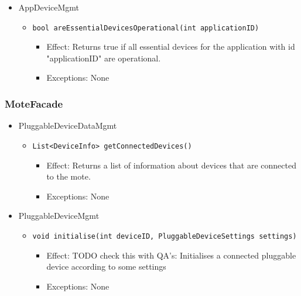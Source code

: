 \begin{itemize}
            \item AppDeviceMgmt
            \begin{itemize}
                \item \texttt{bool areEssentialDevicesOperational(int applicationID)}
                \begin{itemize}
                    \item Effect: Returns true if all essential devices for the application
                                  with id "applicationID" are operational.
                    \item Exceptions: None
                \end{itemize}
            \end{itemize}
        \end{itemize}

    \subsubsection{MoteFacade}
        \begin{itemize}
            \item PluggableDeviceDataMgmt
            \begin{itemize}
                \item \texttt{List<DeviceInfo> getConnectedDevices()}
                \begin{itemize}
                    \item Effect: Returns a list of information about devices that are connected to the mote.
                    \item Exceptions: None
                \end{itemize}
            \end{itemize}

            \item PluggableDeviceMgmt
            \begin{itemize}
                \item \texttt{void initialise(int deviceID, PluggableDeviceSettings settings)}
                \begin{itemize}
                    \item Effect: TODO check this with QA's: Initialises a connected pluggable device according to some settings
                    \item Exceptions: None
                \end{itemize}
            \end{itemize}
        \end{itemize}

